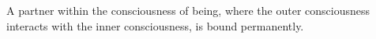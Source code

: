 

A partner within the consciousness of being, where the outer
consciousness interacts with the inner consciousness, is bound
permanently.

\bye
